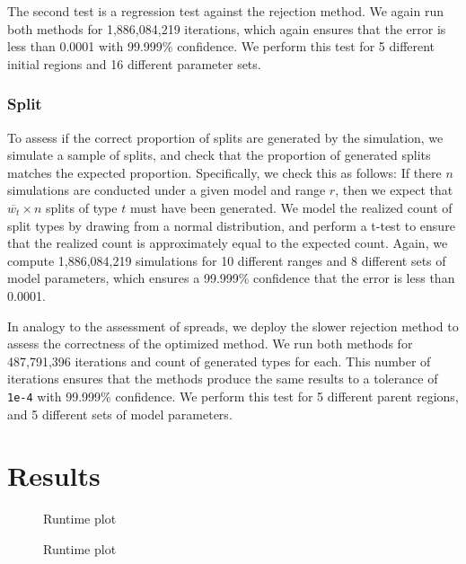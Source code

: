 \documentclass[a4paper]{article}
\begin{document}
The second test is a regression test against the rejection method.
We again run both methods for 1,886,084,219 iterations, which again ensures
that the error is less than 0.0001 with 99.999\% confidence.
We perform this test for 5 different initial regions and 16 different parameter
sets.

\subsubsection{Split}

To assess if the correct proportion of splits are generated by the simulation,
we simulate a sample of splits, and check that the proportion of generated
splits matches the expected proportion.
Specifically, we check this as follows: If there \(n\) simulations are conducted under a given model
and range \( r \), then we expect that  \(\overline{w_t} \times
n\) splits of type \( t \) must have been generated.
We model the realized count of split types by drawing from a normal
distribution, and perform a t-test to ensure that the realized count is
approximately equal to the expected count.
Again, we compute 1,886,084,219 simulations for 10 different ranges and 8
different sets of model parameters, which ensures a 99.999\% confidence that
the error is less than 0.0001.

In analogy to the assessment of spreads, we deploy the slower rejection method to assess the correctness 
of the optimized method.
We run both methods for 487,791,396 iterations and count of generated types for
each.
This number of iterations ensures that the methods produce the same results to
a tolerance of \texttt{1e-4} with 99.999\% confidence.
We perform this test for 5 different parent regions, and 5 different sets of
model parameters.

\section{Results}

\begin{figure}
    \centering
    
    \caption{Runtime plot}\label{fig:runtime-taxa}
\end{figure}

\begin{figure}
    \centering
    
    \caption{Runtime plot}\label{fig:runtime-regions}
\end{figure}
\end{document}

